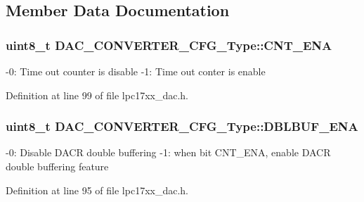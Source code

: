 \subsection{\-Member \-Data \-Documentation}
\hypertarget{struct_d_a_c___c_o_n_v_e_r_t_e_r___c_f_g___type_aa725a7b430c776db0fe786be0acb3fff}{
\subsubsection[{\-C\-N\-T\-\_\-\-E\-N\-A}]{\setlength{\rightskip}{0pt plus 5cm}uint8\-\_\-t {\bf \-D\-A\-C\-\_\-\-C\-O\-N\-V\-E\-R\-T\-E\-R\-\_\-\-C\-F\-G\-\_\-\-Type\-::\-C\-N\-T\-\_\-\-E\-N\-A}}}\label{struct_d_a_c___c_o_n_v_e_r_t_e_r___c_f_g___type_aa725a7b430c776db0fe786be0acb3fff}
-\/0\-: \-Time out counter is disable -\/1\-: \-Time out conter is enable 

\-Definition at line 99 of file lpc17xx\-\_\-dac.\-h.

\hypertarget{struct_d_a_c___c_o_n_v_e_r_t_e_r___c_f_g___type_ac6181d741003e4984192878dadb98abc}{
\subsubsection[{\-D\-B\-L\-B\-U\-F\-\_\-\-E\-N\-A}]{\setlength{\rightskip}{0pt plus 5cm}uint8\-\_\-t {\bf \-D\-A\-C\-\_\-\-C\-O\-N\-V\-E\-R\-T\-E\-R\-\_\-\-C\-F\-G\-\_\-\-Type\-::\-D\-B\-L\-B\-U\-F\-\_\-\-E\-N\-A}}}\label{struct_d_a_c___c_o_n_v_e_r_t_e_r___c_f_g___type_ac6181d741003e4984192878dadb98abc}
-\/0\-: \-Disable \-D\-A\-C\-R double buffering -\/1\-: when bit \-C\-N\-T\-\_\-\-E\-N\-A, enable \-D\-A\-C\-R double buffering feature 

\-Definition at line 95 of file lpc17xx\-\_\-dac.\-h.

